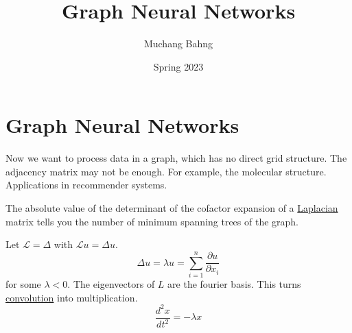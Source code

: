 \documentclass{article}
\begin{document}

\title{Graph Neural Networks}
\author{Muchang Bahng}
\date{Spring 2023}

\maketitle
\tableofcontents
\pagebreak 




\section{Graph Neural Networks} 

  Now we want to process data in a graph, which has no direct grid structure. The adjacency matrix may not be enough. For example, the molecular structure. Applications in recommender systems. 

  The absolute value of the determinant of the cofactor expansion of a \hyperref[mv-def:laplacian]{Laplacian} matrix tells you the number of minimum spanning trees of the graph. 

  Let $\mathcal{L} = \Delta$ with $\mathcal{L} u = \Delta u$. 
  \begin{equation}
    \Delta u = \lambda u = \sum_{i=1}^n \frac{\partial u}{\partial x_i}
  \end{equation}
  for some $\lambda < 0$. The eigenvectors of $L$ are the fourier basis. This turns \hyperref[prob-def:convolution]{convolution} into multiplication. 
  \begin{equation}
    \frac{d^2 x}{d t^2} = - \lambda x 
  \end{equation}



\end{document}
